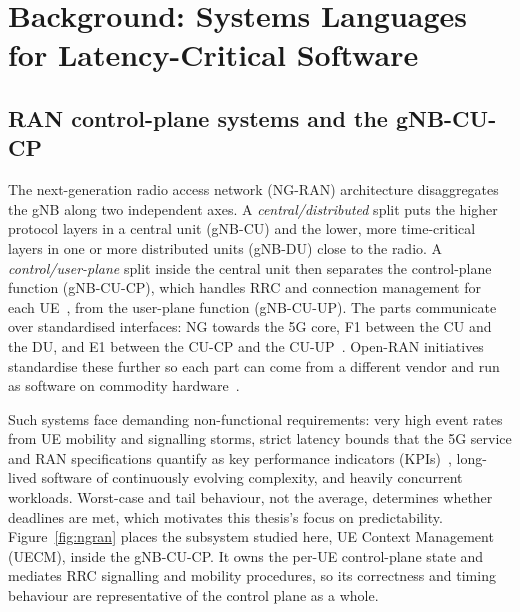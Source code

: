 \chapter{Background: Systems Languages for Latency-Critical Software\label{chapter:background}}

\section{RAN control-plane systems and the gNB-CU-CP}\label{sec:ranarch}
The next-generation radio access network (NG-RAN) architecture disaggregates the gNB along two
independent axes. A \emph{central/distributed} split puts the higher protocol layers in a central
unit (gNB-CU) and the lower, more time-critical layers in one or more distributed units (gNB-DU)
close to the radio. A \emph{control/user-plane} split inside the central unit then separates the
control-plane function (gNB-CU-CP), which handles RRC and connection management for each
UE~\cite{3gpp38401,3gpp38300,3gpp38331}, from the user-plane function (gNB-CU-UP). The parts
communicate over standardised interfaces: NG towards the 5G core, F1 between the CU and the DU,
and E1 between the CU-CP and the CU-UP~\cite{3gpp38401,3gpp38300,3gpp38463}. Open-RAN
initiatives standardise these further so each part can come from a different vendor and run as
software on commodity hardware~\cite{polese2023oran}.

Such systems face demanding non-functional requirements: very high event rates from UE mobility
and signalling storms, strict latency bounds that the 5G service and RAN specifications quantify
as key performance indicators (KPIs)~\cite{3gpp38913,3gpp22261}, long-lived software of
continuously evolving complexity, and heavily concurrent workloads. Worst-case and tail behaviour,
not the average, determines whether deadlines are met, which motivates this thesis's focus on
predictability. Figure~\ref{fig:ngran} places the subsystem studied here, UE Context Management
(UECM), inside the gNB-CU-CP. It owns the per-UE control-plane state and mediates RRC signalling
and mobility procedures, so its correctness and timing behaviour are representative of the control
plane as a whole.

